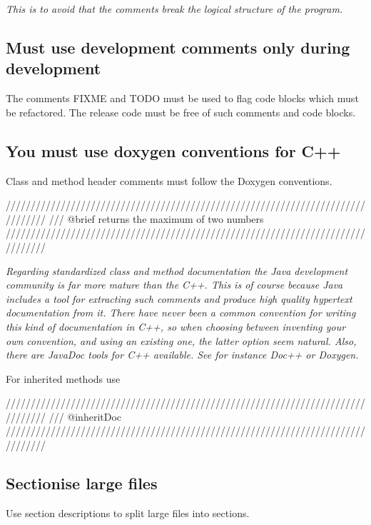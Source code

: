 \documentclass[a4paper,11pt,oneside]{scrbook}
\newcommand{\guideline}[1]{{\subsection{#1}}}
\newcommand{\motivation}[1]{{\normalfont \itshape #1}}
\newcommand{\trcode}[1]{{\normalfont \ttfamily #1}}
\begin{document}
\motivation{
  This is to avoid that the comments break the logical structure of the program.  
}

\guideline{Must use development comments only during development}

The comments \trcode{FIXME} and \trcode{TODO} must be used to flag code blocks
which must be refactored. The release code must be free of such comments and
code blocks.

\guideline{You must use doxygen conventions for C++}

Class and method header comments must follow the Doxygen conventions.
 
\begin{code}
  ////////////////////////////////////////////////////////////////////////////////
  /// @brief returns the maximum of two numbers
  ////////////////////////////////////////////////////////////////////////////////
\end{code}

\motivation{
  Regarding standardized class and method documentation the Java development
  community is far more mature than the C++. This is of course because Java
  includes a tool for extracting such comments and produce high quality
  hypertext documentation from it.  There have never been a common convention
  for writing this kind of documentation in C++, so when choosing between
  inventing your own convention, and using an existing one, the latter option
  seem natural. Also, there are JavaDoc tools for C++ available. See for
  instance Doc++ or Doxygen.
}

For inherited methods use

\begin{code}
  ////////////////////////////////////////////////////////////////////////////////
  /// {@inheritDoc}
  ////////////////////////////////////////////////////////////////////////////////
\end{code}

\guideline{Sectionise large files}

Use section descriptions to split large files into sections.
\end{document}

